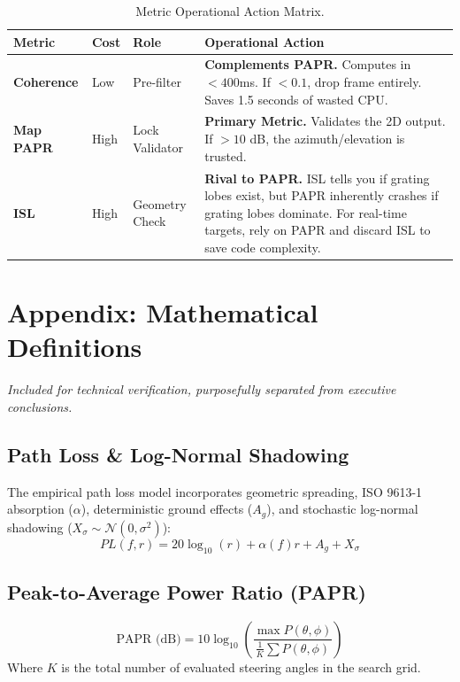 \documentclass[12pt,letterpaper]{article}
\begin{document}
\begin{table}[h!]
    \centering
    \begin{tabularx}{\textwidth}{l l l X}
    \toprule
    \textbf{Metric} & \textbf{Cost} & \textbf{Role} & \textbf{Operational Action} \\
    \midrule
    \textbf{Coherence} & Low & Pre-filter & \textbf{Complements PAPR.} Computes in $<400$ms. If $< 0.1$, drop frame entirely. Saves 1.5 seconds of wasted CPU. \\
    \midrule
    \textbf{Map PAPR} & High & Lock Validator & \textbf{Primary Metric.} Validates the 2D output. If $> 10$ dB, the azimuth/elevation is trusted. \\
    \midrule
    \textbf{ISL} & High & Geometry Check & \textbf{Rival to PAPR.} ISL tells you if grating lobes exist, but PAPR inherently crashes if grating lobes dominate. For real-time targets, rely on PAPR and discard ISL to save code complexity. \\
    \bottomrule
    \end{tabularx}
    \caption{Metric Operational Action Matrix.}
\end{table}

\newpage
\appendix
\section{Appendix: Mathematical Definitions}
\textit{Included for technical verification, purposefully separated from executive conclusions.}

\subsection{Path Loss \& Log-Normal Shadowing}
The empirical path loss model incorporates geometric spreading, ISO 9613-1 absorption ($\alpha$), deterministic ground effects ($A_g$), and stochastic log-normal shadowing ($X_\sigma \sim \mathcal{N}(0, \sigma^2)$):
\begin{equation}
    PL(f, r) = 20\log_{10}(r) + \alpha(f)r + A_g + X_\sigma
\end{equation}

\subsection{Peak-to-Average Power Ratio (PAPR)}
\begin{equation}
    \text{PAPR (dB)} = 10\log_{10}\left( \frac{\max P(\theta, \phi)}{\frac{1}{K}\sum P(\theta, \phi)} \right)
\end{equation}
Where $K$ is the total number of evaluated steering angles in the search grid.
\end{document}
